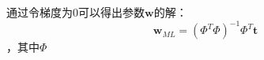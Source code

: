 \documentclass[paper=a4,fontsize=11pt]{xetexpNote}
\begin{document}
\begin{compactitem}[\color{RoyalBlue}$\circ$]
    
    通过令梯度为0可以得出参数$\mathbf{w}$的解：\[ \mathbf{w}_{ML} = (\Phi^T \Phi)^{-1} \Phi^T \mathbf{t} \]，其中$\Phi$
    
    
\end{compactitem}


%
\end{document}
